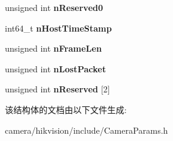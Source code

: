 \begin{DoxyCompactItemize}
unsigned int {\bfseries n\+Reserved0}
\item 
\mbox{\label{struct___m_v___f_r_a_m_e___o_u_t___i_n_f_o___a0596cd419e5040faeeddad497a834a41}} 
int64\+\_\+t {\bfseries n\+Host\+Time\+Stamp}
\item 
\mbox{\label{struct___m_v___f_r_a_m_e___o_u_t___i_n_f_o___a215b2ea05206310fd9ada3b746e241a0}} 
unsigned int {\bfseries n\+Frame\+Len}
\item 
\mbox{\label{struct___m_v___f_r_a_m_e___o_u_t___i_n_f_o___aea15360fdf55839c648f61aa9659f7b1}} 
unsigned int {\bfseries n\+Lost\+Packet}
\item 
\mbox{\label{struct___m_v___f_r_a_m_e___o_u_t___i_n_f_o___a0f0708abcb4079dbad4a7ed4f1e7b3ea}} 
unsigned int {\bfseries n\+Reserved} \mbox{[}2\mbox{]}
\end{DoxyCompactItemize}


该结构体的文档由以下文件生成\+:\begin{DoxyCompactItemize}
\item 
camera/hikvision/include/Camera\+Params.\+h\end{DoxyCompactItemize}

